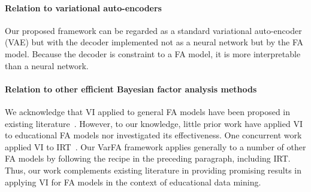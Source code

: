 \documentclass{edm_article}
\begin{document}
\vspace{-10pt}
\paragraph{Relation to variational auto-encoders}Our proposed framework can be regarded as a standard variational auto-encoder (VAE) but with the decoder implemented not as a neural network but by the FA model. Because the decoder is constraint to a FA model, it is more interpretable than a neural network. 

\vspace{-10pt}
\paragraph{Relation to other efficient Bayesian factor analysis methods}
We acknowledge that VI applied to general FA models have been proposed in existing literature~\cite{ghahramani2000variational,zhao2009note}. However, to our knowledge, little prior work have applied VI to educational FA models nor investigated its effectiveness. One concurrent work applied VI to IRT~\cite{wu2020variational}. Our VarFA framework applies generally to a number of other FA models by following the recipe in the preceding paragraph, including IRT. Thus, our work complements existing literature in providing promising results in applying VI for FA models in the context of educational data mining.


\end{document}
